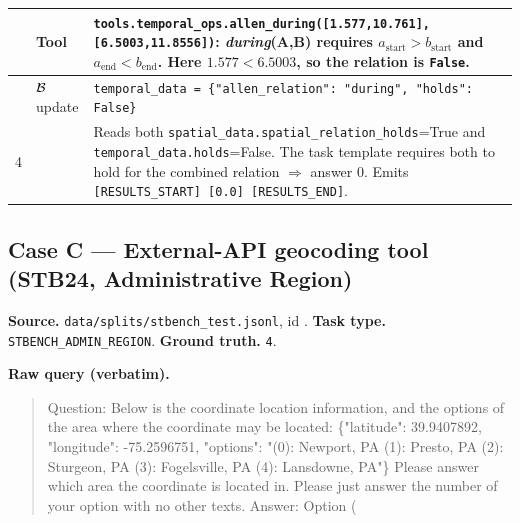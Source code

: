 \begin{table}[H]
\begin{tabular}{c l p{10.5cm}}
\midrule
  & Tool &
\texttt{tools.temporal\_ops.allen\_during([1.577,10.761], [6.5003,11.8556])}: \emph{during}(A,B) requires $a_{\text{start}} > b_{\text{start}}$ and $a_{\text{end}} < b_{\text{end}}$. Here $1.577 < 6.5003$, so the relation is \texttt{False}. \\
\midrule
  & $\mathcal{B}$ update &
\texttt{temporal\_data = \{"allen\_relation": "during", "holds": False\}} \\
\midrule
4 & \sfuse{} &
Reads both \texttt{spatial\_data.spatial\_relation\_holds}=True and \texttt{temporal\_data.holds}=False.  The task template requires both to hold for the combined relation $\Rightarrow$ answer $0$. Emits \texttt{[RESULTS\_START] [0.0] [RESULTS\_END]}. \\
\bottomrule
\end{tabular}
\end{table}
\FloatBarrier
\subsection{Case C --- External-API geocoding tool (STB24, Administrative Region)}
\label{app:case_c}

\textbf{Source.} \texttt{data/splits/stbench\_test.jsonl}, id \texttt{}.
\textbf{Task type.} \texttt{STBENCH\_ADMIN\_REGION}.
\textbf{Ground truth.} \texttt{4}.

\textbf{Raw query (verbatim).}
\begin{quote}\small\ttfamily
Question: Below is the coordinate location information, and the options of the area where the coordinate may be located:
\{"latitude": 39.9407892, "longitude": -75.2596751,
 "options": "(0): Newport, PA (1): Presto, PA (2): Sturgeon, PA (3): Fogelsville, PA (4): Lansdowne, PA"\}
Please answer which area the coordinate is located in. Please just answer the number of your option with no other texts.
Answer: Option (
\end{quote}

